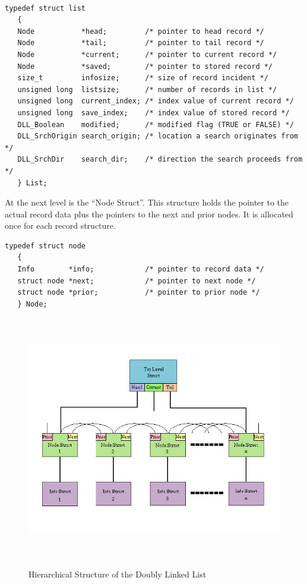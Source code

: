 \documentclass[10pt,letterpaper,titlepage]{article}
\begin{document}
\small
\begin{verbatim}

typedef struct list
   {
   Node           *head;         /* pointer to head record */
   Node           *tail;         /* pointer to tail record */
   Node           *current;      /* pointer to current record */
   Node           *saved;        /* pointer to stored record */
   size_t         infosize;      /* size of record incident */
   unsigned long  listsize;      /* number of records in list */
   unsigned long  current_index; /* index value of current record */
   unsigned long  save_index;    /* index value of stored record */
   DLL_Boolean    modified;      /* modified flag (TRUE or FALSE) */
   DLL_SrchOrigin search_origin; /* location a search originates from */
   DLL_SrchDir    search_dir;    /* direction the search proceeds from */
   } List;
\end{verbatim}
\normalsize
\vspace{8pt}

\noindent
At the next level is the ``Node Struct''.  This structure holds the pointer to the actual record data plus the pointers to the next and prior nodes.  It is allocated once for each record structure.

\small
\begin{verbatim}
typedef struct node
   {
   Info        *info;            /* pointer to record data */
   struct node *next;            /* pointer to next node */
   struct node *prior;           /* pointer to prior node */
   } Node;
\end{verbatim}
\normalsize
\vspace{8pt}

\begin{figure}
\begin{center}
\graphicspath{{.}}
\includegraphics[width=4.75in,height=4.2in]{linklistDiagram.png}
\vspace{8pt}

Hierarchical Structure of the Doubly Linked List
\end{center}
\end{figure}
\end{document}
